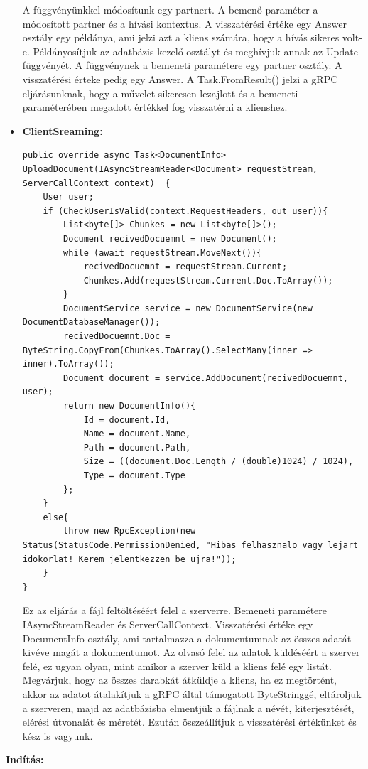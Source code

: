 \documentclass[
]{thesis-ekf}
\theoremstyle{definition}
\theoremstyle{remark}
\begin{document}
\begin{itemize}[leftmargin=0pt]
\begin{lstlisting}[showstringspaces=false,caption={Partner módosítása.},captionpos=b]
	\end{lstlisting}
	A függvényünkkel módosítunk egy partnert. A bemenő paraméter a módosított partner és a hívási kontextus. A visszatérési értéke egy Answer osztály egy példánya, ami jelzi azt a kliens számára, hogy a hívás sikeres volt-e. Példányosítjuk az adatbázis kezelő osztályt és meghívjuk annak az Update függvényét. A függvénynek a bemeneti paramétere egy partner osztály. A visszatérési érteke pedig egy Answer. A Task.FromResult() jelzi a gRPC eljárásunknak, hogy a művelet sikeresen lezajlott és a bemeneti paraméterében megadott értékkel fog visszatérni a klienshez.
	\item \textbf{ClientSreaming: }
			\begin{lstlisting}[showstringspaces=false,caption={ Dokumentum feltöltésnek a szerver oldala.},captionpos=b]
public override async Task<DocumentInfo> UploadDocument(IAsyncStreamReader<Document> requestStream, ServerCallContext context)  {
	User user;
    if (CheckUserIsValid(context.RequestHeaders, out user)){
		List<byte[]> Chunkes = new List<byte[]>();
		Document recivedDocuemnt = new Document();
		while (await requestStream.MoveNext()){
			recivedDocuemnt = requestStream.Current;
			Chunkes.Add(requestStream.Current.Doc.ToArray());
		}
		DocumentService service = new DocumentService(new DocumentDatabaseManager());
		recivedDocuemnt.Doc = ByteString.CopyFrom(Chunkes.ToArray().SelectMany(inner => inner).ToArray());
		Document document = service.AddDocument(recivedDocuemnt, user);
		return new DocumentInfo(){
			Id = document.Id,
			Name = document.Name,
			Path = document.Path,
			Size = ((document.Doc.Length / (double)1024) / 1024),
			Type = document.Type
		};
	}
	else{
		throw new RpcException(new Status(StatusCode.PermissionDenied, "Hibas felhasznalo vagy lejart idokorlat! Kerem jelentkezzen be ujra!"));
	}
}
	\end{lstlisting}
	Ez az eljárás a fájl feltöltéséért felel a szerverre. Bemeneti paramétere IAsyncStreamReader és ServerCallContext. Visszatérési értéke egy DocumentInfo osztály, ami tartalmazza a dokumentumnak az összes adatát kivéve magát a dokumentumot. Az olvasó felel az adatok küldéséért a szerver felé, ez ugyan olyan, mint amikor a szerver küld a kliens felé egy listát. Megvárjuk, hogy az összes darabkát átküldje a kliens, ha ez megtörtént, akkor az adatot átalakítjuk a gRPC által támogatott ByteStringgé, eltároljuk a szerveren, majd az adatbázisba elmentjük a fájlnak a névét, kiterjesztését, elérési útvonalát és méretét. Ezután összeállítjuk a visszatérési értékünket és kész is vagyunk.
\end{itemize}
\textbf{Indítás: }
\end{document}
